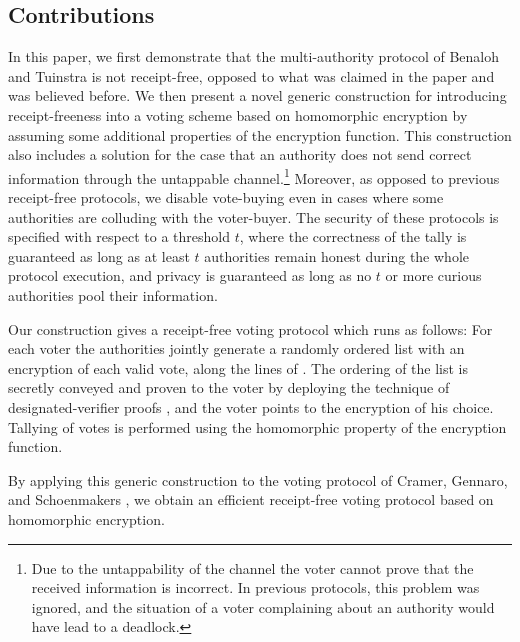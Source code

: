 \documentclass{article}
\begin{document}
\subsection{Contributions}

In this paper, we first demonstrate that the multi-authority protocol
of Benaloh and Tuinstra \cite{BT94} is not receipt-free, opposed to what
was claimed in the paper and was believed before.
We then present a novel generic construction for introducing
receipt-freeness into a voting scheme based on homomorphic encryption
by assuming some additional properties of the encryption function.
This construction also includes a solution for the case that an
authority does not send correct information through the untappable
channel.\footnote{Due to the untappability of the channel the voter
  cannot prove that the received information is incorrect. In previous
  protocols, this problem was ignored, and the situation of a voter
  complaining about an authority would have lead to a deadlock.}
Moreover, as opposed to previous receipt-free protocols, we disable
vote-buying even in cases where some authorities are colluding with
the voter-buyer. The security of these protocols is specified with
respect to a threshold $t$, where the correctness of the tally is
guaranteed as long as at least $t$ authorities remain honest during
the whole protocol execution, and privacy is guaranteed as long as no
$t$ or more curious authorities pool their information.

Our construction gives a receipt-free voting protocol which runs as
follows: For each voter the authorities jointly generate a randomly
ordered list with an encryption of each valid vote, along the lines
of \cite{SK95}. The ordering of the list is secretly conveyed and proven
to the voter by deploying the technique of designated-verifier proofs
\cite{JSI96}, and the voter points to the encryption of his
choice. Tallying of votes is performed using the homomorphic property
of the encryption function.

By applying this generic construction to the voting protocol of
Cramer, Gennaro, and Schoenmakers \cite{CGS97}, we obtain an efficient
receipt-free voting protocol based on homomorphic encryption.
\end{document}
